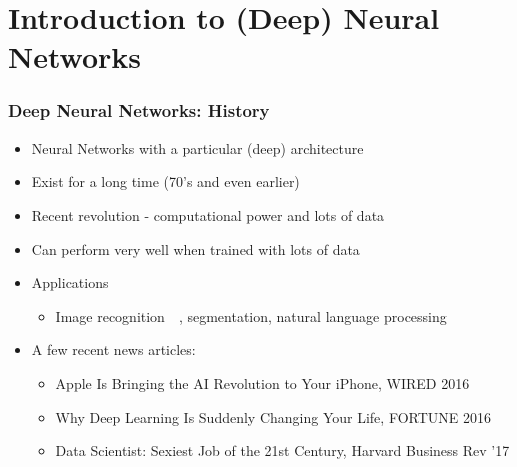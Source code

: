 \documentclass[12pt,fleqn]{beamer}
\begin{document}


\section{Introduction to (Deep) Neural Networks} %
\label{sec:introduction_to_deep_neural_networks}

\begin{frame}\frametitle{Deep Neural Networks: History}

\begin{itemize}
	\item Neural Networks with a particular (deep) architecture
    \item Exist for a long time (70's and even earlier)~\cite{Rosenblatt1958,Rumelhart1986,LeCun1990}
    \item Recent revolution - computational power and lots of data~\cite{bengio2009learning,RainaEtAl2009,lecun2015deep}
    \item Can perform very well when trained with lots of data
    \item Applications
    \begin{itemize}
    \item Image recognition~~\cite{hinton2012deep,KrizhevskySutskeverHinton2012,lecun2015deep}, segmentation, natural language processing~\cite{BordesEtAl2014,CollobertEtAl2011,  JeanEtAl2014}
    \end{itemize}


    \pause

\item A few recent news articles:

 \begin{itemize}
    \item
{Apple Is Bringing the AI Revolution to Your iPhone, WIRED 2016}
\item
{Why Deep Learning Is Suddenly Changing Your Life,  FORTUNE 2016}
\item Data Scientist: Sexiest Job of the 21st Century, Harvard Business Rev ’17
\end{itemize}

\end{itemize}
\end{frame}
\end{document}
